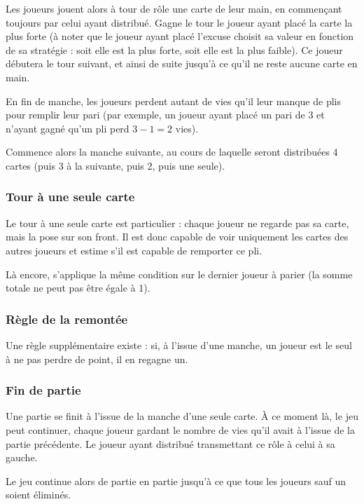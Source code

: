          Les joueurs jouent alors à tour de rôle une carte de leur main, en commençant toujours par celui ayant distribué.
         Gagne le tour le joueur ayant placé la carte la plus forte (à noter que le joueur ayant placé l'excuse choisit sa valeur en fonction de sa stratégie : soit elle est la plus forte, soit elle est la plus faible).
         Ce joueur débutera le tour suivant, et ainsi de suite jusqu'à ce qu'il ne reste aucune carte en main.

         En fin de manche, les joueurs perdent autant de vies qu'il leur manque de plis pour remplir leur pari (par exemple, un joueur ayant placé un pari de 3 et n'ayant gagné qu'un pli perd $3-1 = 2$ vies).

         Commence alors la manche suivante, au cours de laquelle seront distribuées 4 cartes (puis 3 à la suivante, puis 2, puis une seule).
      \subsubsection{Tour à une seule carte}
         Le tour à une seule carte est particulier : chaque joueur ne regarde pas sa carte, mais la pose sur son front.
         Il est donc capable de voir uniquement les cartes des autres joueurs et estime s'il est capable de remporter ce pli.

         Là encore, s'applique la même condition sur le dernier joueur à parier (la somme totale ne peut pas être égale à 1).

      \subsubsection{Règle de la \og remontée \fg{}}
         Une règle supplémentaire existe : si, à l'issue d'une manche, un joueur est le seul à ne pas perdre de point, il en regagne un.

      \subsubsection{Fin de partie}
         Une partie se finit à l'issue de la manche d'une seule carte.
         À ce moment là, le jeu peut continuer, chaque joueur gardant le nombre de vies qu'il avait à l'issue de la partie précédente.
         Le joueur ayant distribué transmettant ce rôle à celui à sa gauche.

         Le jeu continue alors de partie en partie jusqu'à ce que tous les joueurs sauf un soient éliminés.


